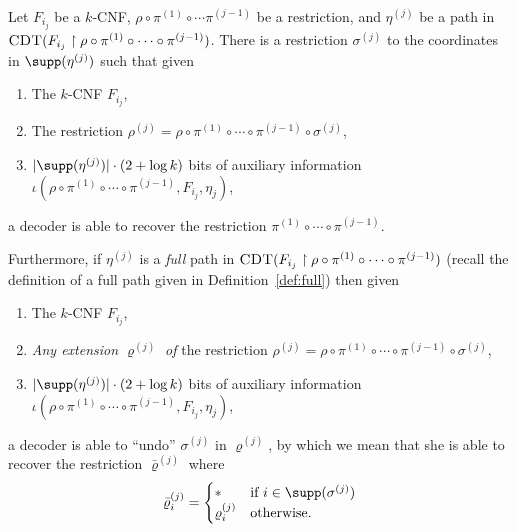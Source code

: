 \documentclass{toc}
\theoremstyle{plain}
\newcommand{\uhr}{\upharpoonright}
\newcommand{\CDT}{\textsc{CDT}}
\begin{document}
\begin{fact}
\label{fact:raz} 
Let $F_{i_j}$ be a $k$-CNF, $\rho \circ \pi^{(1)}\circ\cdots \pi^{(j-1)}$ be a restriction, and $\eta^{(j)}$ be  a path in $\CDT(F_{i_j}\uhr \rho\circ \pi^{(1)} \circ \cdots \circ \pi^{(j-1)})$.  There is a restriction $\sigma^{(j)}$ to the coordinates in $\supp(\eta^{(j)})$ such that given 
\begin{enumerate}
\item The $k$-CNF $F_{i_j}$, 
\item The restriction $\rho^{(j)} = \rho \circ \pi^{(1)} \circ \cdots \circ \pi^{(j-1)} \circ \sigma^{(j)}$, 
\item $|\supp(\eta^{(j)})|\cdot (2 + \log k)$ bits of auxiliary information $\iota(\rho \circ \pi^{(1)}\circ\cdots \circ\pi^{(j-1)}, F_{i_j},\eta_j)$,
\end{enumerate} 
a decoder is able to recover the restriction $\pi^{(1)} \circ \cdots \circ \pi^{(j-1)}$. 

Furthermore, if $\eta^{(j)}$ is a \emph{full} path in $\CDT(F_{i_j}\uhr \rho\circ \pi^{(1)} \circ \cdots \circ \pi^{(j-1)})$ (recall the definition of a full path given in Definition~\ref{def:full}) then given 
\begin{enumerate}
\item The $k$-CNF $F_{i_j}$, 
\item \emph{Any extension $\varrho^{(j)}$ of} the restriction $\rho^{(j)} = \rho \circ \pi^{(1)} \circ \cdots \circ \pi^{(j-1)} \circ \sigma^{(j)}$, 
\item $|\supp(\eta^{(j)})|\cdot (2 + \log k)$ bits of auxiliary information $\iota(\rho \circ \pi^{(1)}\circ\cdots \circ\pi^{(j-1)}, F_{i_j},\eta_j)$,\end{enumerate}
a decoder is able to ``undo'' $\sigma^{(j)}$ in $\varrho^{(j)}$, by which we mean that she is able to recover the restriction $\bar{\varrho}^{(j)}$ where 
\[ 
\bar{\varrho}^{(j)}_i = \begin{cases} 
\ast & \text{if $i\in \supp(\sigma^{(j)})$} \\
\varrho^{(j)}_i & \text{otherwise.} 
\end{cases} 
\] 
\end{fact} 
\end{document}
